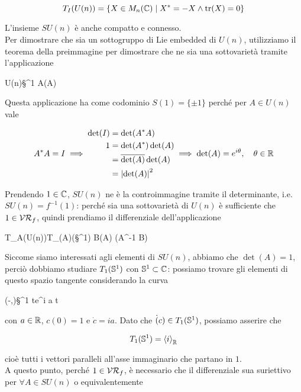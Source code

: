 \begin{equation}
	T_{I}(U(n)) = \{ X \in M_{n}(\C) \mid X^{*} = -X \wedge \tr(X) = 0 \}
\end{equation}

L'insieme $ SU(n) $ è anche compatto e connesso.\\
Per dimostrare che sia un sottogruppo di Lie embedded di $ U(n) $, utilizziamo il teorema della preimmagine per dimostrare che ne sia una sottovarietà tramite l'applicazione

%
	{U(n)}{\S^{1}}%
	{A}{\det(A)}

Questa applicazione ha come codominio $ S(1) = \{ \pm 1 \} $ perché per $ A \in U(n) $ vale

\begin{equation}
	A^{*} A = I \implies %
	\begin{aligned}
		\det(I) &= \det(A^{*} A)\\
		1 &= \det(A^{*}) \det(A)\\
		&= \overline{\det(A)} \det(A)\\
		&= \abs{\det(A)}^{2}
	\end{aligned}%
	\implies %
	\det(A) = e^{i \theta} \qcomma \theta \in \R
\end{equation}

Prendendo $ 1 \in \C $, $ SU(n) $ ne è la controimmagine tramite il determinante, i.e. $ SU(n) = f^{-1}(1) $: perché sia una sottovarietà di $ U(n) $ è sufficiente che $ 1 \in \VR_{f} $, quindi prendiamo il differenziale dell'applicazione 

%
	{T_{A}(U(n))}{T_{\det(A)}(\S^{1})}%
	{B}{\det(A) \tr(A^{-1} B)}
	
Siccome siamo interessati agli elementi di $ SU(n) $, abbiamo che $ \det(A) = 1 $, perciò dobbiamo studiare $ T_{1}(\S^{1}) $ con $ \S^{1} \subset \C $: possiamo trovare gli elementi di questo spazio tangente considerando la curva

%
	{(-\varepsilon,\varepsilon)}{\S^{1}}%
	{t}{e^{i a t}}
	
con $ a \in \R $, $ c(0) = 1 $ e $ \dot{c} = i a $. Dato che $ \dot(c) \in T_{1}(\S^{1}) $, possiamo asserire che

\begin{equation}
	T_{1}(\S^{1}) = \ev{i}_{\R}
\end{equation}

cioè tutti i vettori paralleli all'asse immaginario che partano in $ 1 $.\\
A questo punto, perché $ 1 \in \VR_{f} $, è necessario che il differenziale sua suriettivo per $ \forall A \in SU(n) $ o equivalentemente

